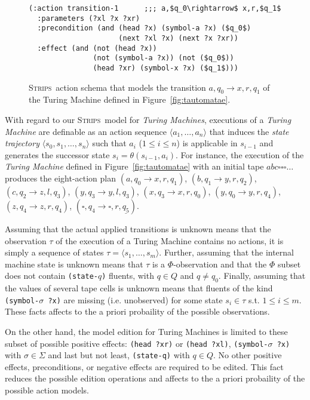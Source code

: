 \documentclass[letterpaper]{article} %
\newcommand{\tup}[1]{{\langle #1 \rangle}}
\newcommand{\strips}{\textsc{Strips}}     %
\begin{document}
\begin{figure}
\begin{scriptsize}
\begin{lstlisting}
(:action transition-1      ;;; a,$q_0\rightarrow$ x,r,$q_1$
  :parameters (?xl ?x ?xr)
  :precondition (and (head ?x) (symbol-a ?x) ($q_0$)
                     (next ?xl ?x) (next ?x ?xr))
  :effect (and (not (head ?x)) 
               (not (symbol-a ?x)) (not ($q_0$))
               (head ?xr) (symbol-x ?x) ($q_1$)))
\end{lstlisting}
\end{scriptsize}
 \caption{\small \strips\ action schema that models the transition $a,q_0\rightarrow x,r,q_1$ of the Turing Machine defined in Figure~\ref{fig:tautomatae}.}
\label{fig:update-rule}
\end{figure}

With regard to our \strips\ model for {\em Turing Machines}, executions of a {\em Turing Machine} are definable as an action sequence $\tup{a_1, \ldots, a_n}$ that induces the {\em state trajectory} $\tup{s_0, s_1, \ldots, s_n}$ such that $a_i$ ({\small $1\leq i\leq n$}) is applicable in $s_{i-1}$ and generates the successor state $s_i=\theta(s_{i-1},a_i)$. For instance, the execution of the {\em Turing Machine} defined in Figure~\ref{fig:tautomatae} with an initial tape $abc\square\square\square\ldots$ produces the eight-action plan {\small $(a,q_0\rightarrow x,r,q_1)$, $(b,q_1\rightarrow y,r,q_2)$, $(c,q_2\rightarrow z,l,q_3)$, $(y,q_3\rightarrow y,l,q_3)$, $(x,q_3\rightarrow x,r,q_0)$, $(y,q_0\rightarrow y,r,q_4)$, $(z,q_4\rightarrow z,r,q_4)$, $(\square,q_4\rightarrow \square,r,\underline{q_5})$}.

Assuming that the actual applied transitions is unknown means that the observation $\tau$ of the execution of a Turing Machine contains no actions, it is simply a sequence of states $\tau=\tup{s_1, \ldots , s_m}$. Further, assuming that the internal machine state is unknown means that $\tau$ is a $\Phi$-observation and that the $\Phi$ subset does not contain {\small\tt (state-$q$)} fluents, with $q\in Q$ and $q\neq q_0$. Finally, assuming that the values of several tape cells is unknown means that fluents of the kind {\small\tt (symbol-$\sigma$ ?x)} are missing (i.e. unobserved) for some state $s_i\in \tau$ s.t. $1\leq i\leq m$. These facts affects to the a priori probaility of the possible observations.

On the other hand, the model edition for Turing Machines is limited to these subset of possible positive effects: {\tt (head ?xr)} or {\tt (head ?xl)}, {\tt(symbol-$\sigma$ ?x)} with $\sigma \in \Sigma$ and last but not least, {\tt (state-q)} with $q\in Q$. No other positive effects, preconditions, or negative effects are required to be edited. This fact reduces the possible edition operations and affects to the a priori probaility of the possible action models.
\end{document}
